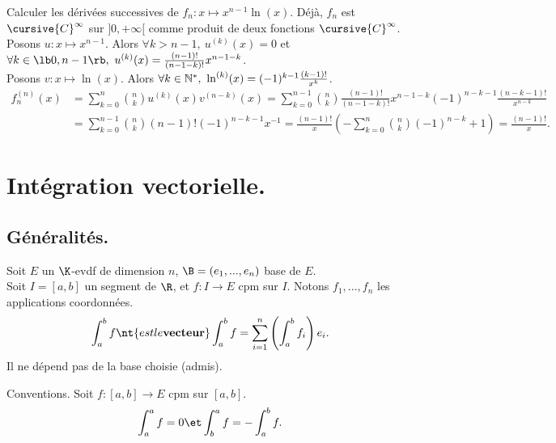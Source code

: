 \documentclass[11pt]{article}
\begin{document}
\begin{ex}{}{}
    Calculer les dérivées successives de $f_n:x\mapsto x^{n-1}\ln(x)$.
    \tcblower
    Déjà, $f_n$ est $\cursive{C}^{\infty}$ sur $]0,+\infty[$ comme produit de deux fonctions $\cursive{C}^\infty$.\\
    Posons $u:x\mapsto x^{n-1}$. Alors $\forall k > n-1, ~ u^{(k)}(x)=0$ et $\forall k \in \lb0,n-1\rb, ~ u^{(k)}(x)=\frac{(n-1)!}{(n-1-k)!}x^{n-1-k}$.\\
    Posons $v:x\mapsto \ln(x)$. Alors $\forall k \in \mathbb{N}^*, ~ \ln^{(k)}(x)=(-1)^{k-1}\frac{(k-1)!}{x^k}$.
    \begin{align*}
        f_n^{(n)}(x)&=\sum_{k=0}^n\binom{n}{k}u^{(k)}(x)v^{(n-k)}(x)=\sum_{k=0}^{n-1}\binom{n}{k}\frac{(n-1)!}{(n-1-k)!}x^{n-1-k}(-1)^{n-k-1}\frac{(n-k-1)!}{x^{n-k}}\\
        &=\sum_{k=0}^{n-1}\binom{n}{k}(n-1)!(-1)^{n-k-1}x^{-1}=\frac{(n-1)!}{x}\left(-\sum_{k=0}^{n}\binom{n}{k}(-1)^{n-k}+1\right) = \frac{(n-1)!}{x}. 
    \end{align*}
\end{ex}

\section{Intégration vectorielle.}

\subsection{Généralités.}

\begin{defi}{}{}
    Soit $E$ un $\K$-evdf de dimension $n$, $\B=(e_1,...,e_n)$ base de $E$.\\
    Soit $I=[a,b]$ un segment de $\R$, et $f:I\to E$ cpm sur $I$. Notons $f_1,...,f_n$ les applications coordonnées.
    \begin{equation*}
        \int_a^b f \nt{ est le \bf{vecteur} } \int_a^b f = \sum_{i=1}^n\left( \int_a^b f_i \right)e_i.
    \end{equation*} 
    Il ne dépend pas de la base choisie (admis).
\end{defi}

\begin{defi}{Conventions.}{}
    Soit $f:[a,b]\to E$ cpm sur $[a,b]$.
    \begin{equation*}
        \int_a^a f = 0 \et \int_b^a f = -\int_a^b f.
    \end{equation*}
\end{defi}
\end{document}
